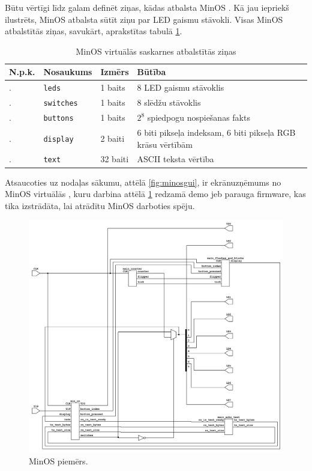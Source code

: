 Būtu vērtīgi līdz galam definēt ziņas, kādas atbalsta MinOS
. Kā jau iepriekš ilustrēts, MinOS
 atbalsta sūtīt ziņu par LED gaismu stāvokli.
Visas MinOS atbalstītās ziņas, savukārt, aprakstītas tabulā
\ref{table:minospackets}.

\begin{table}[H]
    \newcommand\rownumber{\stepcounter{minospacketcounter}\arabic{minospacketcounter}.}
    \begin{tabular}{ |p{1cm}|p{3cm}|p{2cm}|p{8cm}| }
    \hline
    N.p.k.&Nosaukums&Izmērs&Būtība \\
    \hline
    \rownumber&\lstinline!leds!&1 baits&8 LED gaismu stāvoklis \\
    \hline
    \rownumber&\lstinline!switches!&1 baits&8 slēdžu stāvoklis \\
    \hline
    \rownumber&\lstinline!buttons!&1 baits&\(2^8\) spiedpogu nospiešanas fakts \\
    \hline
    \rownumber&\lstinline!display!&2 baiti&6 biti pikseļa indeksam, 6 biti pikseļa RGB krāsu vērtībām \\
    \hline
    \rownumber&\lstinline!text!&32 baiti&ASCII teksta vērtība \\
    \hline
    \end{tabular}
    \centering
    \captionsetup{justification=centering}
    \caption{MinOS virtuālās saskarnes atbalstītās ziņas}
    \label{table:minospackets}
\end{table}

Atsaucoties uz nodaļas sākumu, attēlā \ref{fig:minosgui}, ir ekrānuzņēmums no
MinOS virtuālās , kuru darbina attēlā
\ref{fig:minosusage} redzamā demo jeb parauga \gls{firmware}, kas tika
izstrādāta, lai atrādītu MinOS darboties spēju.

\begin{figure}[H]
    \includegraphics[width=1.0\linewidth]{assets/min-os-usage-grey.png}
    \centering
    \caption{MinOS  piemērs.}
    \label{fig:minosusage}
\end{figure}


